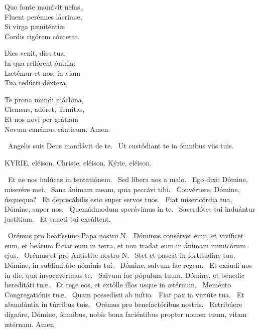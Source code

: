 Quo fonte manávit nefas,\\
Fluent perénnes lácrimæ,\\
Si virga pæniténtiæ\\
Cordis rigórem cónterat.

Dies venit, dies tua,\\
In qua reflórent ómnia:\\
Lætémur et nos, in viam\\
Tua redúcti déxtera.

Te prona mundi máchina,\\
Clemens, adóret, Trínitas,\\
Et nos novi per grátiam\\
Novum canámus cánticum. Amen.

\V\ Angelis suis Deus mandávit de te. \R\ Ut custódiant te in ómnibus viis tuis.




KYRIE, eléison. Christe, eléison. Kýrie, eléison.

 \V\ Et ne nos indúcas in tentatiónem. \R\ Sed líbera nos a malo. \V\ Ego dixi: Dómine, miserére mei. \R\ Sana ánimam meam, quia peccávi tibi. \V\ Convértere, Dómine, úsquequo? \R\ Et deprecábilis esto super servos tuos. \V\ Fiat misericórdia tua, Dómine, super nos. \R\ Quemádmodum sperávimus in te. \V\ Sacerdótes tui induántur justítiam. \R\ Et sancti tui exsúltent.

\V\ Orémus pro beatíssimo Papa nostro N. \R\ Dóminus consérvet eum, et vivíficet eum, et beátum fáciat eum in terra, et non tradat eum in ánimam inimicórum ejus. \V\ Orémus et pro Antístite nostro N. \R\ Stet et pascat in fortitúdine tua, Dómine, in sublimitáte nóminis tui. \V\ Dómine, salvum fac regem. \R\ Et exáudi nos in die, qua invocavérimus te. \V\ Salvum fac pópulum tuum, Dómine, et bénedic hereditáti tuæ. \R\ Et rege eos, et extólle illos usque in ætérnum. \V\ Meménto Congregatiónis tuæ. \R\ Quam possedísti ab inítio. \V\ Fiat pax in virtúte tua. \R\ Et abundántia in túrribus tuis. \V\ Orémus pro benefactóribus nostris. \R\ Retribúere dignáre, Dómine, ómnibus, nobis bona faciéntibus propter nomen tuum, vitam ætérnam. Amen.


